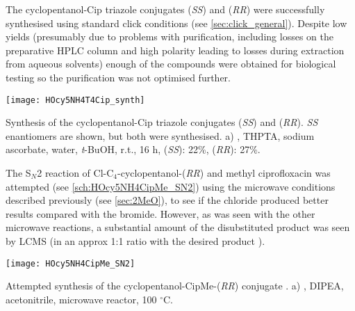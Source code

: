 The cyclopentanol-Cip triazole conjugates  (\textit{SS}) and  (\textit{RR}) were successfully synthesised using standard click conditions (see \ref{sec:click_general}). 
Despite low yields (presumably due to problems with purification, including losses on the preparative HPLC column and high polarity leading to losses during extraction from aqueous solvents) enough of the compounds were obtained for biological testing so the purification was not optimised further.

\begin{scheme}[H]
	\begin{center}
		\texttt{[image: HOcy5NH4T4Cip\_synth]}
		\caption{Synthesis of the cyclopentanol-Cip triazole conjugates  (\textit{SS}) and 
		 (\textit{RR}). 
		\textit{SS} enantiomers are shown, but both were synthesised.
		a) , THPTA, sodium ascorbate, water, \textit{t}-BuOH, r.t., 16 h, 
		 (\textit{SS}): 22\%,
		 (\textit{RR}): 27\%. 
		\label{sch:HOcy5NH4T4Cip_synth}}
	\end{center}
\end{scheme}

The S$_N$2 reaction of Cl-C$_4$-cyclopentanol-(\textit{RR})  and methyl ciprofloxacin  was attempted (see \ref{sch:HOcy5NH4CipMe_SN2}) using the microwave conditions described previously (see \ref{sec:2MeO}), to see if the chloride produced better results compared with the bromide. However, as was seen with the other microwave reactions, a substantial amount of the disubstituted product  was seen by LCMS (in an approx 1:1 ratio with the desired product ). 

\begin{scheme}[H]
	\begin{center}
		\texttt{[image: HOcy5NH4CipMe\_SN2]}
		\caption{Attempted synthesis of the cyclopentanol-CipMe-(\textit{RR}) conjugate .
		a) , DIPEA, acetonitrile, microwave reactor, 100 $^{\circ}$C.
		\label{sch:HOcy5NH4CipMe_SN2}}
	\end{center}
\end{scheme}

